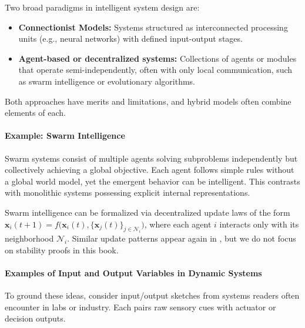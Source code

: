 Two broad paradigms in intelligent system design are:

\begin{itemize}
    \item \textbf{Connectionist Models:} Systems structured as interconnected processing units (e.g., neural networks) with defined input-output stages.
    \item \textbf{Agent-based or decentralized systems:} Collections of agents or modules that operate semi-independently, often with only local communication, such as swarm intelligence or evolutionary algorithms.
\end{itemize}

Both approaches have merits and limitations, and hybrid models often combine elements of each.

\paragraph{Example: Swarm Intelligence}

Swarm systems consist of multiple agents solving subproblems independently but collectively achieving a global objective. Each agent follows simple rules without a global world model, yet the emergent behavior can be intelligent. This contrasts with monolithic systems possessing explicit internal representations.

Swarm intelligence can be formalized via decentralized update laws of the form $\mathbf{x}_i(t+1) = f\big(\mathbf{x}_i(t),\{\mathbf{x}_j(t)\}_{j \in \mathcal{N}_i}\big)$, where each agent $i$ interacts only with its neighborhood $\mathcal{N}_i$. Similar update patterns appear again in , but we do not focus on stability proofs in this book.

\paragraph{Examples of Input and Output Variables in Dynamic Systems}

To ground these ideas, consider input/output sketches from systems readers often encounter in labs or industry. Each pairs raw sensory cues with actuator or decision outputs.

